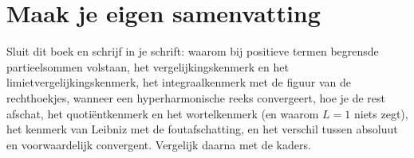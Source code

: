 
\ifzelfstudie
\section*{Maak je eigen samenvatting}
Sluit dit boek en schrijf in je schrift: waarom bij positieve termen begrensde partieelsommen volstaan, het vergelijkingskenmerk en het limietvergelijkingskenmerk, het integraalkenmerk met de figuur van de rechthoekjes, wanneer een hyperharmonische reeks convergeert, hoe je de rest afschat, het quotiëntkenmerk en het wortelkenmerk (en waarom $L = 1$ niets zegt), het kenmerk van Leibniz met de foutafschatting, en het verschil tussen absoluut en voorwaardelijk convergent. Vergelijk daarna met de kaders.
\fi
